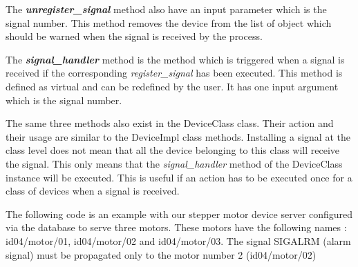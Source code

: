The \textbf{\emph{unregister\_signal}} method
also have an input parameter which is the signal number. This method
removes the device from the list of object which should be warned
when the signal is received by the process.

The \textbf{\emph{signal\_handler}} method
is the method which is triggered when a signal is received if the
corresponding \emph{register\_signal} has been executed. This method
is defined as virtual and can be redefined by the user. It has one
input argument which is the signal number.

The same three methods also exist in the DeviceClass
class. Their action and their usage are similar to the DeviceImpl
class methods. Installing a signal at the class level does not mean
that all the device belonging to this class will receive the signal.
This only means that the \emph{signal\_handler} method of the DeviceClass
instance will be executed. This is useful if an action has to be executed
once for a class of devices when a signal is received.

The following code is an example with our stepper motor device server
configured via the database to serve three motors. These motors have
the following names : id04/motor/01, id04/motor/02 and id04/motor/03.
The signal SIGALRM (alarm signal) must be propagated only to the motor
number 2 (id04/motor/02)

